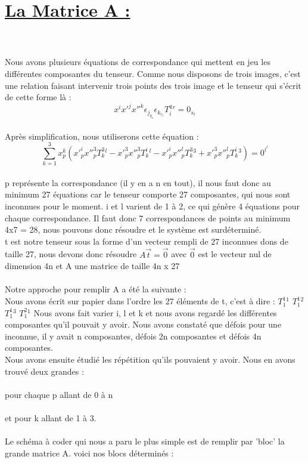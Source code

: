 \documentclass[a4paper,11pt,fleqn]{report}
\begin{document}
	\section{\underline{La Matrice A :}}
	\\\\Nous avons plusieurs \'equations de correspondance qui mettent en jeu les diff\'erentes composantes du tenseur. Comme nous disposons de trois images, c'est une relation faisant intervenir trois points des trois image et le tenseur qui s'\'ecrit de cette forme l\`a : $$x^ix'^jx''^k\epsilon_j_q_s\epsilon_k_r_tT_i^q^r = 0_s_t$$
	\\Apr\`es simplification, nous utiliserons cette \'equation :
	$$\sum \limits_{k=1}^3 x_p^k(x'_p^ix''_p^3T_k^3^l - x'_p^3x''_p^3T_k^i^l - x'_p^ix''_p^lT_k^3^3 + x'_p^3x''_p^lT_k^i^3) = 0^i^l$$
	\\p repr\'esente la correspondance (il y en a n en tout), il nous faut donc au minimum 27 \'equations car le tenseur comporte 27 composantes, qui nous sont inconnues pour le moment. i et l varient de 1 \`a 2, ce qui g\'en\`ere 4 \'equations pour chaque correspondance. Il faut donc 7 correspondances de points au minimum 4x7 = 28, nous pouvons donc r\'esoudre et le syst\`eme est surd\'etermin\'e.
	\\t est notre tenseur sous la forme d'un vecteur rempli de 27 inconnues dons de taille 27, nous devons donc r\'esoudre $A\vec{t} = \vec{0}$ avec $\vec{0}$ est le vecteur nul de dimension 4n et A une matrice de taille 4n x 27
\\
\\ Notre approche pour remplir A a \'et\'e la suivante :\\
Nous avons \'ecrit sur papier dans l'ordre les 27 \'el\'ements de t, c'est \`a dire : $T_1^1^1$ $T_1^1^2$ $T_1^1^3$ $T_1^2^1$
Nous avons fait varier i, l et k et nous avons regard\'e les diff\'erentes composantes qu'il pouvait y avoir. Nous avons constat\'e que d\'efois pour une inconnue, il y avait n composantes, d\'efois 2n composantes et d\'efois 4n composantes.
\\ Nous avons ensuite \'etudi\'e les r\'ep\'etition qu'ils pouvaient y avoir. Nous en avons trouv\'e deux grandes : \\\\pour chaque p allant de 0 \`a n
\\\\et pour k allant de 1 \`a 3.\\\\
Le sch\'ema \`a coder qui nous a paru le plus simple est de remplir par 'bloc' la grande matrice A. voici nos blocs d\'etermin\'es :
\end{document}
